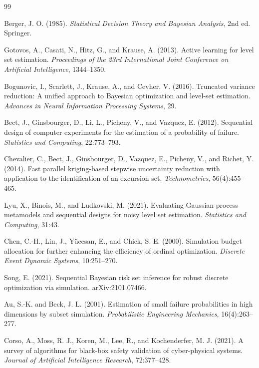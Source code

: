 \documentclass[UTF8,11pt,a4paper,fontset=none]{ctexart}
\newcommand{\1}{\mathbf 1}
\begin{document}
\begin{thebibliography}{99}

Berger, J. O. (1985).
\emph{Statistical Decision Theory and Bayesian Analysis}, 2nd ed.
Springer.

Gotovos, A., Casati, N., Hitz, G., and Krause, A. (2013).
Active learning for level set estimation.
\emph{Proceedings of the 23rd International Joint Conference on Artificial Intelligence}, 1344--1350.

Bogunovic, I., Scarlett, J., Krause, A., and Cevher, V. (2016).
Truncated variance reduction: A unified approach to Bayesian optimization and level-set estimation.
\emph{Advances in Neural Information Processing Systems}, 29.

Bect, J., Ginsbourger, D., Li, L., Picheny, V., and Vazquez, E. (2012).
Sequential design of computer experiments for the estimation of a probability of failure.
\emph{Statistics and Computing}, 22:773--793.

Chevalier, C., Bect, J., Ginsbourger, D., Vazquez, E., Picheny, V., and Richet, Y. (2014).
Fast parallel kriging-based stepwise uncertainty reduction with application to the identification of an excursion set.
\emph{Technometrics}, 56(4):455--465.

Lyu, X., Binois, M., and Ludkovski, M. (2021).
Evaluating Gaussian process metamodels and sequential designs for noisy level set estimation.
\emph{Statistics and Computing}, 31:43.

Chen, C.-H., Lin, J., Y\"{u}cesan, E., and Chick, S. E. (2000).
Simulation budget allocation for further enhancing the efficiency of ordinal optimization.
\emph{Discrete Event Dynamic Systems}, 10:251--270.

Song, E. (2021).
Sequential Bayesian risk set inference for robust discrete optimization via simulation.
arXiv:2101.07466.

Au, S.-K. and Beck, J. L. (2001).
Estimation of small failure probabilities in high dimensions by subset simulation.
\emph{Probabilistic Engineering Mechanics}, 16(4):263--277.

Corso, A., Moss, R. J., Koren, M., Lee, R., and Kochenderfer, M. J. (2021).
A survey of algorithms for black-box safety validation of cyber-physical systems.
\emph{Journal of Artificial Intelligence Research}, 72:377--428.


\end{thebibliography}
\end{document}
